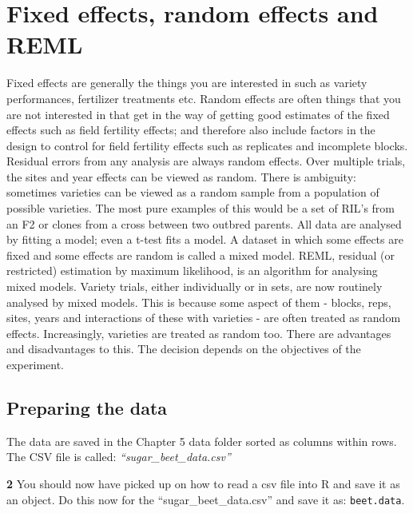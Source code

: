 \documentclass[
]{book}
\makeatletter
\newenvironment{kframe}{%
\medskip{}
\setlength{\fboxsep}{.8em}
 \def\at@end@of@kframe{}%
 \ifinner\ifhmode%
  \def\at@end@of@kframe{\end{minipage}}%
  \begin{minipage}{\columnwidth}%
 \fi\fi%
 \def\FrameCommand##1{\hskip\@totalleftmargin \hskip-\fboxsep
 \colorbox{shadecolor}{##1}\hskip-\fboxsep
     \hskip-\linewidth \hskip-\@totalleftmargin \hskip\columnwidth}%
 \MakeFramed {\advance\hsize-\width
   \@totalleftmargin\z@ \linewidth\hsize
   \@setminipage}}%
 {\par\unskip\endMakeFramed%
 \at@end@of@kframe}
\newenvironment{rmdblock}[1]
  {
  \begin{itemize}
  \renewcommand{\labelitemi}{
    \raisebox{-.7\height}[0pt][0pt]{
      {\setkeys{Gin}{width=3em,keepaspectratio}\texttt{[image: images/\#1]}}
    }
  }
  \setlength{\fboxsep}{1em}
  \begin{kframe}
  \item
  }
  {
  \end{kframe}
  \end{itemize}
  }
\newenvironment{rmdquiz}
  {\begin{rmdblock}{quiz}}
  {\end{rmdblock}}
\makeatother
\begin{document}
\hypertarget{fixed-effects-random-effects-and-reml}{%
\section{Fixed effects, random effects and REML}\label{fixed-effects-random-effects-and-reml}}

Fixed effects are generally the things you are interested in such as variety performances, fertilizer treatments etc. Random effects are often things that you are not interested in that get in the way of getting good estimates of the fixed effects such as field fertility effects; and therefore also include factors in the design to control for field fertility effects such as replicates and incomplete blocks. Residual errors from any analysis are always random effects. Over multiple trials, the sites and year effects can be viewed as random. There is ambiguity: sometimes varieties can be viewed as a random sample from a population of possible varieties. The most pure examples of this would be a set of RIL's from an F2 or clones from a cross between two outbred parents. All data are analysed by fitting a model; even a t-test fits a model. A dataset in which some effects are fixed and some effects are random is called a mixed model. REML, residual (or restricted) estimation by maximum likelihood, is an algorithm for analysing mixed models. Variety trials, either individually or in sets, are now routinely analysed by mixed models. This is because some aspect of them - blocks, reps, sites, years and interactions of these with varieties - are often treated as random effects. Increasingly, varieties are treated as random too. There are advantages and disadvantages to this. The decision depends on the objectives of the experiment.

\hypertarget{preparing-the-data}{%
\subsection{Preparing the data}\label{preparing-the-data}}

The data are saved in the Chapter 5 data folder sorted as columns within rows. The CSV file is called: \emph{``sugar\_beet\_data.csv''}

\begin{rmdquiz}
\textbf{2} You should now have picked up on how to read a csv file into R and save it as an object. Do this now for the ``sugar\_beet\_data.csv'' and save it as: \texttt{beet.data}.\\
\end{rmdquiz}
\end{document}
